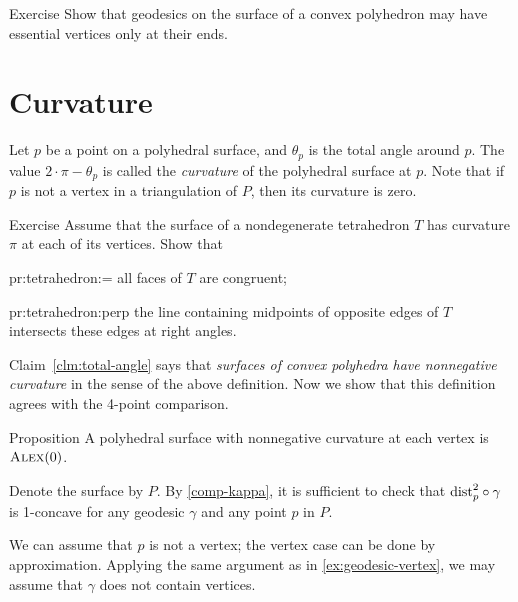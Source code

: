 \begin{thm}{Exercise}\label{ex:geodesic-vertex}
Show that geodesics on the surface of a convex polyhedron may have essential vertices only at their ends.
\end{thm}

\section{Curvature}

Let $p$ be a point on a polyhedral surface, and $\theta_p$ is the total angle around $p$.
The value $2\cdot \pi -\theta_p$ is called the \emph{curvature} of the polyhedral surface at $p$.
Note that if $p$ is not a vertex in a triangulation of $P$, then its curvature is zero.

\begin{thm}{Exercise}\label{pr:tetrahedron}
Assume that the surface of a nondegenerate tetrahedron $T$ has curvature $\pi$ at each of its vertices.
Show that

\begin{subthm}{pr:tetrahedron:=}
all faces of $T$ are congruent;
\end{subthm}

\begin{subthm}{pr:tetrahedron:perp} the line containing midpoints of opposite edges of $T$ intersects these edges at right angles.
\end{subthm}

\end{thm}

Claim~\ref{clm:total-angle} says that \textit{surfaces of convex polyhedra have nonnegative curvature} in the sense of the above definition.
Now we show that this definition agrees with the 4-point comparison.

\begin{thm}{Proposition}\label{prop:poly-CBB}
A polyhedral surface with nonnegative curvature at each vertex is $\textsc{Alex}(0)$.
\end{thm}

Denote the surface by $P$.
By \ref{comp-kappa}, it is sufficient to check that
$\mathrm{dist}_p^2\circ\gamma$ is 1-concave for any geodesic $\gamma$ and any point $p$ in $P$.

We can assume that $p$ is not a vertex;
the vertex case can be done by approximation.
Applying the same argument as in \ref{ex:geodesic-vertex}, we may assume that $\gamma$ does not contain vertices.

